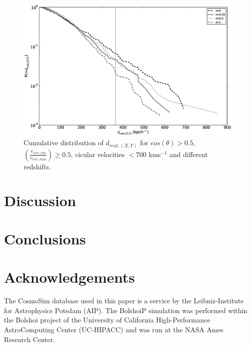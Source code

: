\documentclass{emulateapj}
\begin{document}
\begin{figure}
\begin{center}
\includegraphics[width=1.0\textwidth]{Figures_eps/figure_8_3_nu=0.5_300kms_700kms.eps}
\end{center}
\caption{Cumulative distribution of $d_{real, (X,Y)}$ for $cos(\theta)>0.5$, $\left(\frac{v_{circ,sub}}{v_{circ,halo}}\right)\geq0.5$, 
cicular velocities $<700$ kms$^{-1}$ and different redshifts.} 
\label{cumulative_cos}
\end{figure}


\section{Discussion}
\label{sec:discussion}





\section{Conclusions}
\label{sec:conclusions}





\section*{Acknowledgements}

The CosmoSim database used in this paper is a service by the
Leibniz-Institute for Astrophysics Potsdam (AIP). The  BolshoiP
simulation was performed within the Bolshoi project of the University
of California High-Performance  AstroComputing Center (UC-HIPACC) and
was run at the NASA Ames Research Center. 



 
\end{document}
